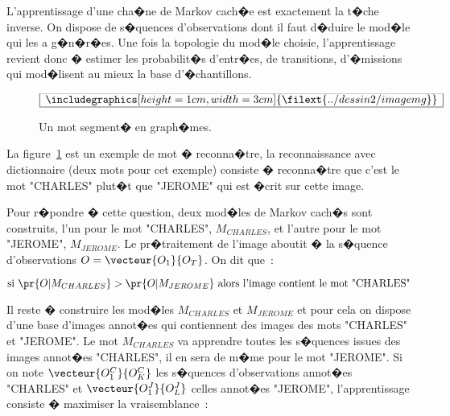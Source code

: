 L'apprentissage d'une cha�ne de Markov cach�e est exactement la t�che inverse. On dispose de s�quences d'observations dont il faut d�duire le mod�le qui les a g�n�r�es. Une fois la topologie du mod�le choisie, l'apprentissage revient donc � estimer les probabilit�s d'entr�es, de transitions, d'�missions qui mod�lisent au mieux la base d'�chantillons.



        \begin{figure}[ht]
      $$\frame{$\begin{array}[c]{c}\includegraphics[height=1cm, width=3cm] 
      {\filext{../dessin2/imagemg}}\end{array}$}$$
    \caption{Un mot segment� en graph�mes.}
    \label{figure_exemple_grapheme}
        \end{figure}

La figure~\ref{figure_exemple_grapheme} est un exemple de mot � reconna�tre, la reconnaissance avec dictionnaire (deux mots pour cet exemple) consiste � reconna�tre que c'est le mot "CHARLES" plut�t que "JEROME" qui est �crit sur cette image.


Pour r�pondre � cette question, deux mod�les de Markov cach�s sont construits, l'un pour le mot "CHARLES", $M_{CHARLES}$, et l'autre pour le mot "JEROME", $M_{JEROME}$. Le pr�traitement de l'image aboutit � la s�quence d'observations $O = \vecteur{O_1}{O_T}$. On dit que~:

        $$
        \text{si } \pr{O|M_{CHARLES}} > \pr{O|M_{JEROME}} \text{ alors l'image contient le mot "CHARLES"}
        $$

Il reste � construire les mod�les $M_{CHARLES}$ et $M_{JEROME}$ et pour cela on dispose d'une base d'images annot�es qui contiennent des images des mots "CHARLES" et "JEROME". Le mot $M_{CHARLES}$ va apprendre toutes les s�quences issues des images annot�es "CHARLES", il en sera de m�me pour le mot "JEROME". Si on note $\vecteur{O_1^C}{O_K^C}$ les s�quences d'observations annot�es "CHARLES" et $\vecteur{O_1^J}{O_L^J}$ celles annot�es "JEROME", l'apprentissage consiste � maximiser la vraisemblance~:


